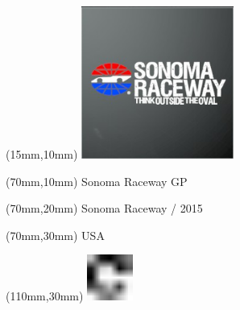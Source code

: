 \null\newpage
\begin{textblock*}{50mm}(15mm,10mm)%
\includegraphics[width=50mm]{LG/2015-05-20_00096.png}
\end{textblock*}
\begin{textblock*}{130mm}(70mm,10mm)%
{\fontsize{20}{20}\selectfont Sonoma Raceway GP}\\
\end{textblock*}
\begin{textblock*}{120mm}(70mm,20mm)%
{\fontsize{16}{16}\selectfont Sonoma Raceway / 2015}\\
\end{textblock*}
\begin{textblock*}{120mm}(70mm,30mm)%
{\fontsize{12}{12}\selectfont USA}
\end{textblock*}
\begin{textblock*}{30mm}(110mm,30mm)%
\centering
\includegraphics[height=15mm]{icons/fa-rotate-right.pdf}
\end{textblock*}
